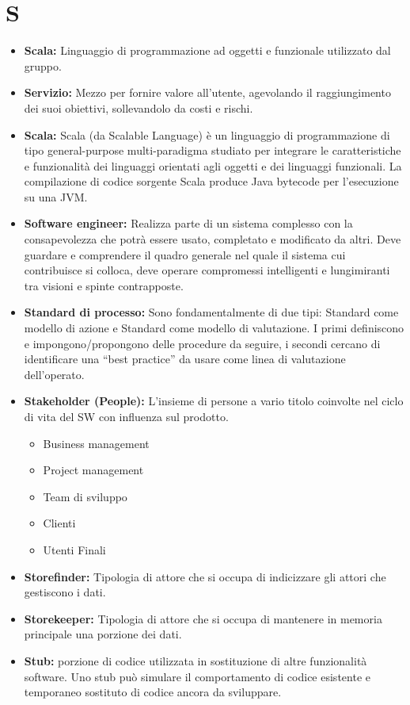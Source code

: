 \documentclass[a4paper]{article}
\begin{document}
	\section{S}
		\begin{itemize}
			\item \textbf{Scala:} Linguaggio di programmazione ad oggetti e funzionale utilizzato dal gruppo.
			\item \textbf{Servizio:} Mezzo per fornire valore all'utente, agevolando il raggiungimento dei suoi obiettivi, 
			sollevandolo da costi e rischi.
			\item \textbf{Scala:} Scala (da Scalable Language) è un linguaggio di programmazione di tipo general-purpose
			 multi-paradigma studiato per integrare le caratteristiche e funzionalità dei linguaggi orientati agli oggetti e dei linguaggi
			  funzionali. La compilazione di codice sorgente Scala produce Java bytecode per l'esecuzione su una JVM.
			\item \textbf{Software engineer:} Realizza parte di un sistema complesso con la consapevolezza che potrà essere 
			usato, completato e modificato da altri. Deve guardare e comprendere il quadro generale nel quale il sistema cui 
			contribuisce si colloca, deve operare compromessi intelligenti e lungimiranti tra visioni e spinte contrapposte.
			\item \textbf{Standard di processo:} Sono fondamentalmente di due tipi: Standard come modello di azione e Standard 
			come modello di valutazione. I primi definiscono e impongono/propongono delle procedure da seguire, i secondi 
			cercano di identificare una “best practice” da usare come linea di valutazione dell’operato.
			\item \textbf{Stakeholder (People):} L’insieme di persone a vario titolo coinvolte nel ciclo di vita del SW con 
			influenza sul prodotto.
			\begin{itemize}
				\item  Business management
			  	\item  Project management
			  	\item  Team di sviluppo
			  	\item  Clienti
			  	\item  Utenti Finali
			\end{itemize}
			\item \textbf{Storefinder:} Tipologia di attore che si occupa di indicizzare gli attori che gestiscono i dati.
			\item \textbf{Storekeeper:} Tipologia di attore che si occupa di mantenere in memoria principale una porzione dei dati.
			\item \textbf{Stub:} porzione di codice utilizzata in sostituzione di altre funzionalità software. Uno stub può 
			simulare il comportamento di codice esistente e temporaneo sostituto di codice ancora da sviluppare.			
		\end{itemize}
		
\end{document}
